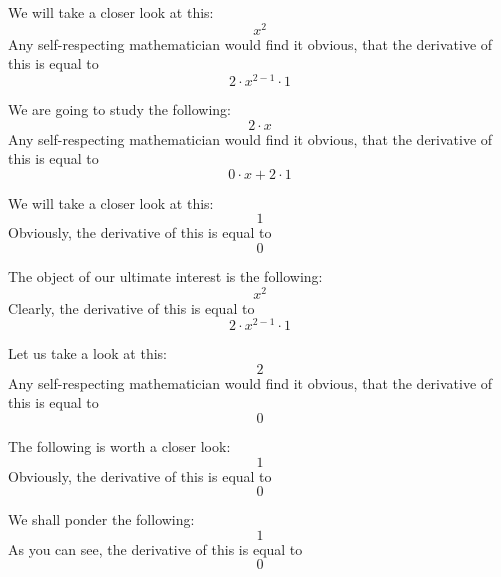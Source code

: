 \documentclass{article}
\begin{document}
We will take a closer look at this:
\begin{equation}
x ^{2 } 
\end{equation}
Any self-respecting mathematician would find it obvious, that the derivative of this is equal to
\begin{equation}
2 \cdot x ^{2 - 1 } \cdot 1 
\end{equation}

We are going to study the following:
\begin{equation}
2 \cdot x 
\end{equation}
Any self-respecting mathematician would find it obvious, that the derivative of this is equal to
\begin{equation}
0 \cdot x + 2 \cdot 1 
\end{equation}

We will take a closer look at this:
\begin{equation}
1 
\end{equation}
Obviously, the derivative of this is equal to
\begin{equation}
0 
\end{equation}

The object of our ultimate interest is the following:
\begin{equation}
x ^{2 } 
\end{equation}
Clearly, the derivative of this is equal to
\begin{equation}
2 \cdot x ^{2 - 1 } \cdot 1 
\end{equation}

Let us take a look at this:
\begin{equation}
2 
\end{equation}
Any self-respecting mathematician would find it obvious, that the derivative of this is equal to
\begin{equation}
0 
\end{equation}

The following is worth a closer look:
\begin{equation}
1 
\end{equation}
Obviously, the derivative of this is equal to
\begin{equation}
0 
\end{equation}

We shall ponder the following:
\begin{equation}
1 
\end{equation}
As you can see, the derivative of this is equal to
\begin{equation}
0 
\end{equation}
\end{document}
